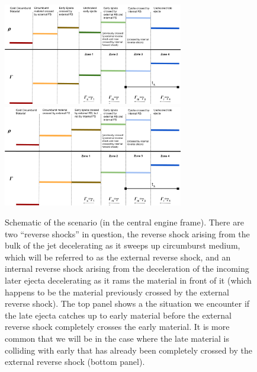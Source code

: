 \documentclass[linenumbers,twocolumn]{aastex631}
\begin{document}
    \begin{figure}[t!]
        \centering
        \includegraphics[width=0.7\textwidth]{schematic-pre-rs-complete.png}\\
        \vspace{1cm}
        \includegraphics[width=0.7\textwidth]{schematic-aft-rs-complete.png}
        \caption{Schematic of the scenario (in the central engine frame). There are two ``reverse shocks'' in question, the reverse shock arising from the bulk of the jet decelerating as it sweeps up circumburst medium, which will be referred to as the external reverse shock, and an internal reverse shock arising from the deceleration of the incoming later ejecta decelerating as it rams the material in front of it (which happens to be the material previously crossed by the external reverse shock). The top panel shows a the situation we encounter if the late ejecta catches up to early material before the external reverse shock completely crosses the early material. It is more common that we will be in the case where the late material is colliding with early that has already been completely crossed by the external reverse shock (bottom panel).}
        \label{fig: schematic}
    \end{figure}
\end{document}
